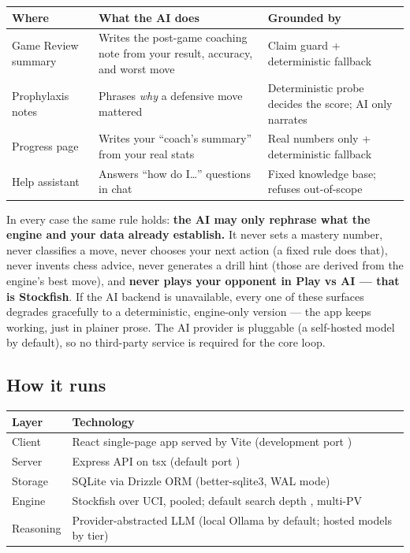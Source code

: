 \documentclass[11pt]{article}
\newcommand{\code}[1]{{\ttfamily #1}}
\begin{document}
\begin{center}
\begin{tabularx}{\linewidth}{@{}l Y l@{}}
\toprule
\textbf{Where} & \textbf{What the AI does} & \textbf{Grounded by} \\
\midrule
Game Review summary & Writes the post-game coaching note from your result, accuracy, and worst move & Claim guard + deterministic fallback \\
Prophylaxis notes & Phrases \emph{why} a defensive move mattered & Deterministic probe decides the score; AI only narrates \\
Progress page & Writes your ``coach's summary'' from your real stats & Real numbers only + deterministic fallback \\
Help assistant & Answers ``how do I\dots'' questions in chat & Fixed knowledge base; refuses out-of-scope \\
\bottomrule
\end{tabularx}
\end{center}

In every case the same rule holds: \textbf{the AI may only rephrase what the
engine and your data already establish.} It never sets a mastery number, never
classifies a move, never chooses your next action (a fixed rule does that),
never invents chess advice, never generates a drill hint (those are derived from
the engine's best move), and \textbf{never plays your opponent in Play vs AI ---
that is Stockfish}. If the AI backend is unavailable, every one of these
surfaces degrades gracefully to a deterministic, engine-only version --- the app
keeps working, just in plainer prose. The AI provider is pluggable
(a self-hosted model by default), so no third-party service is required for the
core loop.

\subsection{How it runs}

\begin{center}
\begin{tabularx}{\linewidth}{@{}l Y@{}}
\toprule
\textbf{Layer} & \textbf{Technology} \\
\midrule
Client & React single-page app served by Vite (development port \code{5173}) \\
Server & Express API on \code{tsx} (default port \code{8030}) \\
Storage & SQLite via Drizzle ORM (\code{better-sqlite3}, WAL mode) \\
Engine & Stockfish over UCI, pooled; default search depth \code{16}, multi-PV \code{4} \\
Reasoning & Provider-abstracted LLM (local Ollama by default; hosted models by tier) \\
\bottomrule
\end{tabularx}
\end{center}
\end{document}
